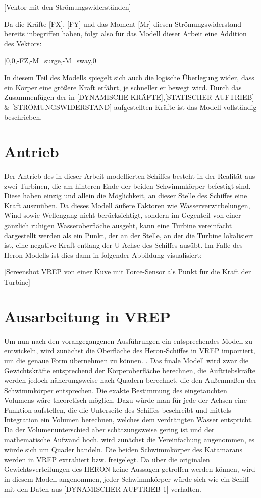[Vektor mit den Strömungswiderständen]

Da die Kräfte [FX], [FY] und das Moment [Mr] diesen Strömungswiderstand bereits inbegriffen haben, folgt also für das Modell dieser Arbeit eine Addition des Vektors:

[0,0,-FZ,-M_surge,-M_sway,0]



In diesem Teil des Modells spiegelt sich auch die logische Überlegung wider, dass ein Körper eine größere Kraft erfährt, je schneller er bewegt wird. Durch das Zusammenfügen der in [DYNAMISCHE KRÄFTE],[STATISCHER AUFTRIEB] & [STRÖMUNGSWIDERSTAND] aufgestellten Kräfte ist das Modell vollständig beschrieben.
%
\section{Antrieb}
%
Der Antrieb des in dieser Arbeit modellierten Schiffes besteht in der Realität aus zwei Turbinen, die am hinteren Ende der beiden Schwimmkörper befestigt sind. Diese haben einzig und allein die Möglichkeit, an dieser Stelle des Schiffes eine Kraft auszuüben. 
Da dieses Modell äußere Faktoren wie Wasserverwirbelungen, Wind sowie Wellengang nicht berücksichtigt, sondern im Gegenteil von einer gänzlich ruhigen Wasseroberfläche ausgeht, kann eine Turbine vereinfacht dargestellt werden als ein Punkt, der an der Stelle, an der die Turbine lokalisiert ist,  eine negative Kraft entlang der U-Achse des Schiffes ausübt. 
Im Falle des Heron-Modells ist dies dann in folgender Abbildung visualisiert:

[Screenshot VREP von einer Kuve mit Force-Sensor als Punkt für die Kraft der Turbine]


%
\section{Ausarbeitung in VREP}
%
Um nun nach den vorangegangenen Ausführungen ein entsprechendes Modell zu entwickeln, wird zunächst die Oberfläche des Heron-Schiffes in VREP importiert, um die genaue Form übernehmen zu können. . 
Das finale Modell wird zwar die Gewichtskräfte entsprechend der Körperoberfläche berechnen, die Auftriebskräfte werden jedoch näherungsweise nach Quadern berechnet, die den Außenmaßen der Schwimmkörper entsprechen. Die exakte Bestimmung des eingetauchten Volumens wäre theoretisch möglich. Dazu würde man für jede der Achsen eine Funktion aufstellen, die die Unterseite des Schiffes beschreibt und mittels Integration ein Volumen berechnen, welches dem verdrängten Wasser entspricht. Da der Volumenunterschied aber schätzungsweise gering ist und der mathematische Aufwand hoch, wird zunächst die Vereinfachung angenommen, es würde sich um Quader handeln.
Die beiden Schwimmkörper des Katamarans werden in VREP extrahiert bzw. freigelegt. Da über die originalen Gewichtsverteilungen des HERON keine Aussagen getroffen werden können, wird in diesem Modell angenommen, jeder Schwimmkörper würde sich wie ein Schiff mit den Daten aus [DYNAMISCHER AUFTRIEB 1] verhalten.

